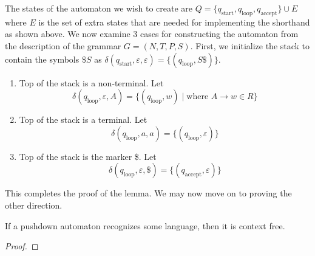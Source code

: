 The states of the automaton we wish to create are $Q = \{q_\text{start}, q_\text{loop}, q_\text{accept}\}\cup E$ where $E$ is the set of extra states that are needed for implementing the shorthand as shown above. We now examine 3 cases for constructing the automaton from the description of the grammar $G = (N, T, P, S)$. First, we initialize the stack to contain the symbols $\$S$ as $\delta(q_\text{start},\varepsilon,\varepsilon)=\{(q_\text{loop},S\$)\}$.
\begin{enumerate}
    \item Top of the stack is a non-terminal. Let 
    \begin{equation*}
        \delta(q_\text{loop},\varepsilon,A)=\{(q_\text{loop},w)\mid\text{where $A\rightarrow w\in R$}\}
    \end{equation*}
    \item Top of the stack is a terminal. Let 
    \begin{equation*}
        \delta(q_\text{loop},a,a) = \{(q_\text{loop},\varepsilon)\}
    \end{equation*}
    \item Top of the stack is the marker \$. Let
    \begin{equation*}
        \delta(q_\text{loop},\varepsilon,\$) = \{(q_\text{accept}, \varepsilon)\}
    \end{equation*}
\end{enumerate}
This completes the proof of the lemma. We may now move on to proving the other direction.

\begin{lemma}
    If a pushdown automaton recognizes some language, then it is context free.
\end{lemma}
\begin{proof}
\end{proof}

